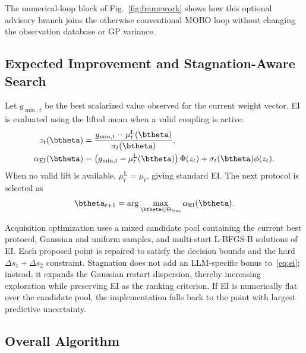 The numerical-loop block of Fig.~\ref{fig:framework} shows how this optional
advisory branch joins the otherwise conventional MOBO loop without changing
the observation database or GP variance.

\subsection{Expected Improvement and Stagnation-Aware Search}

Let $g_{\min,t}$ be the best scalarized value observed for the current weight
vector. EI is evaluated using the lifted mean when a valid coupling is active:
\begin{align}
z_t(\btheta)
&=\frac{g_{\min,t}-\mu_t^{\mathrm L}(\btheta)}
{\sigma_t(\btheta)},\label{eq:ei_z}\\
\alpha_{\mathrm{EI}}(\btheta)
&=\left(g_{\min,t}-\mu_t^{\mathrm L}(\btheta)\right)\Phi(z_t)
+\sigma_t(\btheta)\phi(z_t).
\label{eq:ei}
\end{align}
When no valid lift is available, $\mu_t^{\mathrm L}=\mu_t$, giving standard EI.
The next protocol is selected as
\begin{equation}
\btheta_{t+1}=\arg\max_{\btheta\in\Theta_{\mathrm{feas}}}
\alpha_{\mathrm{EI}}(\btheta).
\label{eq:next_theta}
\end{equation}

Acquisition optimization uses a mixed candidate pool containing the current
best protocol, Gaussian and uniform samples, and multi-start L-BFGS-B solutions
of EI. Each proposed point is repaired to satisfy the decision bounds and the
hard $\Delta s_1+\Delta s_2$ constraint. Stagnation does not add an LLM-specific
bonus to~\eqref{eq:ei}; instead, it expands the Gaussian restart dispersion,
thereby increasing exploration while preserving EI as the ranking criterion. If
EI is numerically flat over the candidate pool, the implementation falls back
to the point with largest predictive uncertainty.

\subsection{Overall Algorithm}


